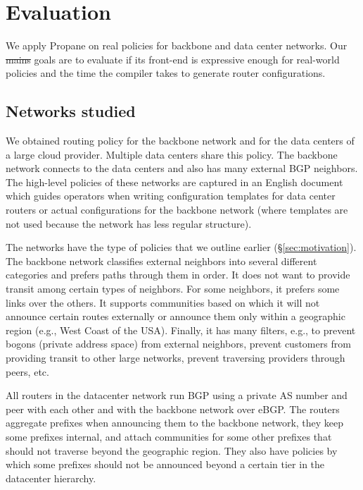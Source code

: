 \documentclass[10pt]{sigalternate052015} %
\newcommand{\sysname}{{\small \sf Propane}\xspace}
\providecommand{\DIFadd}[1]{{\protect\color{blue}\uwave{#1}}} %
\providecommand{\DIFdel}[1]{{\protect\color{red}\sout{#1}}}                      %
\providecommand{\DIFaddbegin}{} %
\providecommand{\DIFaddend}{} %
\providecommand{\DIFdelbegin}{} %
\providecommand{\DIFdelend}{} %
\begin{document}
\DIFdelend \section{Evaluation}
\label{sec:evaluation}


We apply \sysname on real policies for backbone and data center networks. Our \DIFdelbegin \DIFdel{mains }\DIFdelend \DIFaddbegin \DIFadd{main }\DIFaddend goals are to evaluate if its front-end is expressive enough for real-world policies and the time the compiler takes to generate router configurations.

\subsection{Networks studied}

We obtained routing policy for the backbone network and for the data centers of a large cloud provider. Multiple data centers share this policy. The backbone network connects to the data centers and also has many external BGP neighbors. The high-level policies of these networks are captured in an English document which guides operators when writing configuration templates for data center routers or actual configurations for the backbone network (where templates are not used because the network has less regular structure).

The networks have the type of policies that we outline earlier (\S\ref{sec:motivation}). The backbone network classifies external neighbors into several different categories and prefers paths through them in order. It does not want to provide transit among certain types of neighbors. For some neighbors, it prefers some links over the others. It supports communities based on which it will not announce certain routes externally or announce them only within a geographic region (e.g., West Coast of the USA). Finally, it has many filters, e.g., to prevent bogons (private address space) from external neighbors, prevent customers from providing transit to other large networks, prevent traversing providers through peers, etc.

All routers in the datacenter network run BGP using a private AS number and peer with each other and with the backbone network over eBGP. The routers aggregate prefixes when announcing them to the backbone network, they keep some prefixes internal, and attach communities for some other prefixes that should not traverse beyond the geographic region. They also have policies by which some prefixes should not be announced beyond a certain tier in the datacenter hierarchy.
\end{document}

